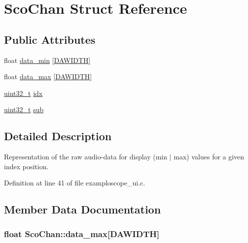 \hypertarget{struct_sco_chan}{}\section{Sco\+Chan Struct Reference}
\label{struct_sco_chan}
\subsection*{Public Attributes}
\begin{DoxyCompactItemize}
\item 
float \hyperlink{struct_sco_chan_a916621c0a1f7073e84959158c96339bf}{data\+\_\+min} \mbox{[}\hyperlink{examploscope__ui_8c_a0fe7fa47ac79246c45ce7a81d11a63db}{D\+A\+W\+I\+D\+TH}\mbox{]}
\item 
float \hyperlink{struct_sco_chan_a1baeae66768a50b901a68e48bc59803b}{data\+\_\+max} \mbox{[}\hyperlink{examploscope__ui_8c_a0fe7fa47ac79246c45ce7a81d11a63db}{D\+A\+W\+I\+D\+TH}\mbox{]}
\item 
\hyperlink{lib-src_2ffmpeg_2win32_2stdint_8h_a6eb1e68cc391dd753bc8ce896dbb8315}{uint32\+\_\+t} \hyperlink{struct_sco_chan_a93db1295c8c6cb7def762e4a7e361e39}{idx}
\item 
\hyperlink{lib-src_2ffmpeg_2win32_2stdint_8h_a6eb1e68cc391dd753bc8ce896dbb8315}{uint32\+\_\+t} \hyperlink{struct_sco_chan_ae510fb6c258e925534c53adedc5f7a9f}{sub}
\end{DoxyCompactItemize}


\subsection{Detailed Description}
Representation of the raw audio-\/data for display (min $\vert$ max) values for a given \textquotesingle{}index\textquotesingle{} position. 

Definition at line 41 of file examploscope\+\_\+ui.\+c.



\subsection{Member Data Documentation}
\subsubsection[{\texorpdfstring{data\+\_\+max}{data_max}}]{\setlength{\rightskip}{0pt plus 5cm}float Sco\+Chan\+::data\+\_\+max\mbox{[}{\bf D\+A\+W\+I\+D\+TH}\mbox{]}}\hypertarget{struct_sco_chan_a1baeae66768a50b901a68e48bc59803b}{}\label{struct_sco_chan_a1baeae66768a50b901a68e48bc59803b}


